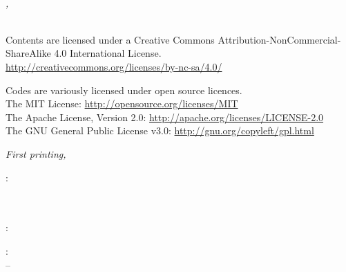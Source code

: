 

\thispagestyle{empty}

\hfill

\vfill

\noindent\myName\\
\textit{\myTitle,}\\
\textcopyright\ \myTime

\bigskip

\noindent Contents are licensed under a Creative Commons Attribution-NonCommercial-ShareAlike 4.0 International License.\\
\url{http://creativecommons.org/licenses/by-nc-sa/4.0/}

\medskip

\noindent Codes are variously licensed under open source licences.\\
The MIT License: \url{http://opensource.org/licenses/MIT}\\
The Apache License, Version 2.0: \url{http://apache.org/licenses/LICENSE-2.0}\\
The GNU General Public License v3.0: \url{http://gnu.org/copyleft/gpl.html}\\

\bigskip

\noindent \textit{First printing, \myDatePrint}

\bigskip

\noindent{}: \\
\mySupervisor \\
\myExaminerA \\
\myExaminerB

\medskip

\noindent{}: \\
\myLocation

\medskip

\noindent{}: \\
\myMonthFirst \xspace \myYearFirst \xspace -- \myMonthLast \xspace \myYearLast
